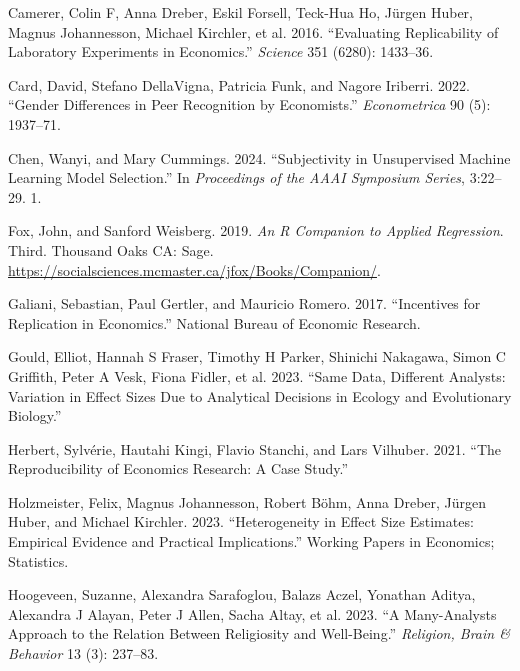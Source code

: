 \documentclass[
  letterpaper,
  DIV=11,
  numbers=noendperiod]{scrartcl}
\newlength{\cslhangindent}
\newlength{\cslentryspacingunit} %
\newenvironment{CSLReferences}[2] %
 {%
  \setlength{\parindent}{0pt}
  \ifodd #1
  \let\oldpar\par
  \def\par{\hangindent=\cslhangindent\oldpar}
  \fi
  \setlength{\parskip}{#2\cslentryspacingunit}
 }%
 {}
\begin{document}
\begin{CSLReferences}{1}{0}
\leavevmode{}%
Camerer, Colin F, Anna Dreber, Eskil Forsell, Teck-Hua Ho, Jürgen Huber,
Magnus Johannesson, Michael Kirchler, et al. 2016. {``Evaluating
Replicability of Laboratory Experiments in Economics.''} \emph{Science}
351 (6280): 1433--36.

\leavevmode{}%
Card, David, Stefano DellaVigna, Patricia Funk, and Nagore Iriberri.
2022. {``Gender Differences in Peer Recognition by Economists.''}
\emph{Econometrica} 90 (5): 1937--71.

\leavevmode{}%
Chen, Wanyi, and Mary Cummings. 2024. {``Subjectivity in Unsupervised
Machine Learning Model Selection.''} In \emph{Proceedings of the AAAI
Symposium Series}, 3:22--29. 1.

\leavevmode{}%
Fox, John, and Sanford Weisberg. 2019. \emph{An {R} Companion to Applied
Regression}. Third. Thousand Oaks {CA}: Sage.
\url{https://socialsciences.mcmaster.ca/jfox/Books/Companion/}.

\leavevmode{}%
Galiani, Sebastian, Paul Gertler, and Mauricio Romero. 2017.
{``Incentives for Replication in Economics.''} National Bureau of
Economic Research.

\leavevmode{}%
Gould, Elliot, Hannah S Fraser, Timothy H Parker, Shinichi Nakagawa,
Simon C Griffith, Peter A Vesk, Fiona Fidler, et al. 2023. {``Same Data,
Different Analysts: Variation in Effect Sizes Due to Analytical
Decisions in Ecology and Evolutionary Biology.''}

\leavevmode{}%
Herbert, Sylvérie, Hautahi Kingi, Flavio Stanchi, and Lars Vilhuber.
2021. {``The Reproducibility of Economics Research: A Case Study.''}

\leavevmode{}%
Holzmeister, Felix, Magnus Johannesson, Robert Böhm, Anna Dreber, Jürgen
Huber, and Michael Kirchler. 2023. {``Heterogeneity in Effect Size
Estimates: Empirical Evidence and Practical Implications.''} Working
Papers in Economics; Statistics.

\leavevmode{}%
Hoogeveen, Suzanne, Alexandra Sarafoglou, Balazs Aczel, Yonathan Aditya,
Alexandra J Alayan, Peter J Allen, Sacha Altay, et al. 2023. {``A
Many-Analysts Approach to the Relation Between Religiosity and
Well-Being.''} \emph{Religion, Brain \& Behavior} 13 (3): 237--83.


\end{CSLReferences}
\end{document}
